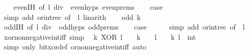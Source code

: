 \begin{isabellebody}
\ \ \isamarkupfalse%
\ even{\isachardot}{\kern0pt}IH\ {\isacharbrackleft}{\kern0pt}of\ {\isacartoucheopen}l\ div\ {}{\isacartoucheclose}{\isacharbrackright}{\kern0pt}\ even{\isachardot}{\kern0pt}hyps\ even{\isachardot}{\kern0pt}prems\isanewline
\ \ \isamarkupfalse%
\ {\isacharquery}{\kern0pt}case\isanewline
\ \ \ \ \isamarkupfalse%
\ {\isacharparenleft}{\kern0pt}simp\ add{\isacharcolon}{\kern0pt}\ or{\isacharunderscore}{\kern0pt}int{\isacharunderscore}{\kern0pt}rec\ {\isacharbrackleft}{\kern0pt}of\ {\isacharunderscore}{\kern0pt}\ l{\isacharbrackright}{\kern0pt}{\isacharparenright}{\kern0pt}\ linarith\isanewline
{}\isamarkupfalse%
\isanewline
\ \ \isamarkupfalse%
\ {\isacharparenleft}{\kern0pt}odd\ k{\isacharparenright}{\kern0pt}\isanewline
\ \ \isamarkupfalse%
\ odd{\isachardot}{\kern0pt}IH\ {\isacharbrackleft}{\kern0pt}of\ {\isacartoucheopen}l\ div\ {}{\isacartoucheclose}{\isacharbrackright}{\kern0pt}\ odd{\isachardot}{\kern0pt}hyps\ odd{\isachardot}{\kern0pt}prems\isanewline
\ \ \isamarkupfalse%
\ {\isacharquery}{\kern0pt}case\isanewline
\ \ \ \ \isamarkupfalse%
\ {\isacharparenleft}{\kern0pt}simp\ add{\isacharcolon}{\kern0pt}\ or{\isacharunderscore}{\kern0pt}int{\isacharunderscore}{\kern0pt}rec\ {\isacharbrackleft}{\kern0pt}of\ {\isacharunderscore}{\kern0pt}\ l{\isacharbrackright}{\kern0pt}{\isacharparenright}{\kern0pt}\isanewline
{}\isamarkupfalse%
%
\endisatagproof
{\isafoldproof}%
%
\isadelimproof
\isanewline
%
\endisadelimproof
\isanewline
{}\isamarkupfalse%
\ xor{\isacharunderscore}{\kern0pt}nonnegative{\isacharunderscore}{\kern0pt}int{\isacharunderscore}{\kern0pt}iff\ {\isacharbrackleft}{\kern0pt}simp{\isacharbrackright}{\kern0pt}{\isacharcolon}{\kern0pt}\isanewline
\ \ {\isacartoucheopen}k\ XOR\ l\ {\isasymge}\ {}\ {\isasymlongleftrightarrow}\ {\isacharparenleft}{\kern0pt}k\ {\isasymge}\ {}\ {\isasymlongleftrightarrow}\ l\ {\isasymge}\ {}{\isacharparenright}{\kern0pt}{\isacartoucheclose}\ \ k\ l\ {\isacharcolon}{\kern0pt}{\isacharcolon}{\kern0pt}\ int\isanewline
%
\isadelimproof
\ \ %
\endisadelimproof
%
\isatagproof
{}\isamarkupfalse%
\ {\isacharparenleft}{\kern0pt}simp\ only{\isacharcolon}{\kern0pt}\ bit{\isachardot}{\kern0pt}xor{\isacharunderscore}{\kern0pt}def\ or{\isacharunderscore}{\kern0pt}nonnegative{\isacharunderscore}{\kern0pt}int{\isacharunderscore}{\kern0pt}iff{\isacharparenright}{\kern0pt}\ auto%

\end{isabellebody}

